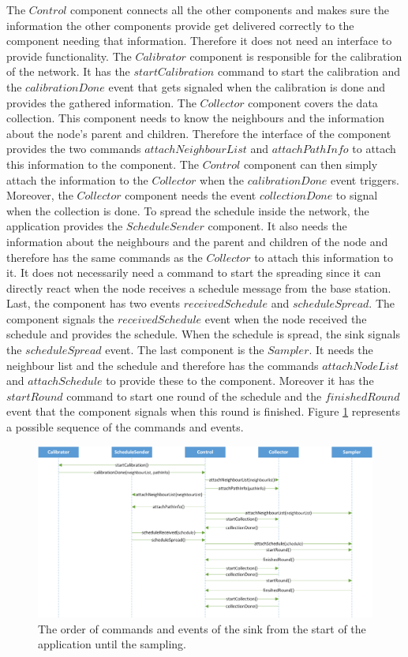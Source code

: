 The $Control$ component connects all the other components and makes sure the information the other components provide get delivered correctly to the component needing that information. Therefore it does not need an interface to provide functionality.     
The $Calibrator$ component is responsible for the calibration of the network. It has the $startCalibration$ command to start the calibration and the $calibrationDone$ event that gets signaled when the calibration is done and provides the gathered information. The $Collector$ component covers the data collection. This component needs to know the neighbours and the information about the node's parent and children. Therefore the interface of the component provides the two commands $attachNeighbourList$ and $attachPathInfo$ to attach this information to the component. The $Control$ component can then simply attach the information to the $Collector$ when the $calibrationDone$ event triggers. Moreover, the $Collector$ component needs the event $collectionDone$ to signal when the collection is done. To spread the schedule inside the network, the application provides the $ScheduleSender$ component. It also needs the information about the neighbours and the parent and children of the node and therefore has the same commands as the $Collector$ to attach this information to it. It does not necessarily need a command to start the spreading since it can directly react when the node receives a schedule message from the base station. Last, the component has two events $receivedSchedule$ and $scheduleSpread$. The component signals the $receivedSchedule$ event when the node received the schedule and provides the schedule. When the schedule is spread, the sink signals the $scheduleSpread$ event. The last component is the $Sampler$. It needs the neighbour list and the schedule and therefore has the commands $attachNodeList$ and $attachSchedule$ to provide these to the component. Moreover it has the $startRound$ command to start one round of the schedule and the $finishedRound$ event that the component signals when this round is finished. Figure \ref{fig:commandEvents} represents a possible sequence of the commands and events.

\begin{figure}[btp]
	\centering
    \includegraphics[scale=0.55]{content/images/Processes/ComandsEvents}
   	\caption{The order of commands and events of the sink from the start of the application until the sampling.}
    \label{fig:commandEvents}
\end{figure}

